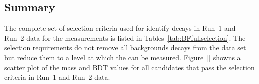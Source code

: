 \subsection{Summary}
\label{sec:BFsummary}
The complete set of selection criteria used for identify \bmumu decays in Run~1 and Run~2 data for the \BF measurements is listed in Tables~\ref{tab:BFfullselection}. %
The selection requirements do not remove all backgrounds decays from the data set but reduce them to a level at which the \BFs can be measured. Figure~\ref{} showns a scatter plot of the mass and BDT values for all candidates that pass the selection criteria in Run~1 and Run~2 data. %
